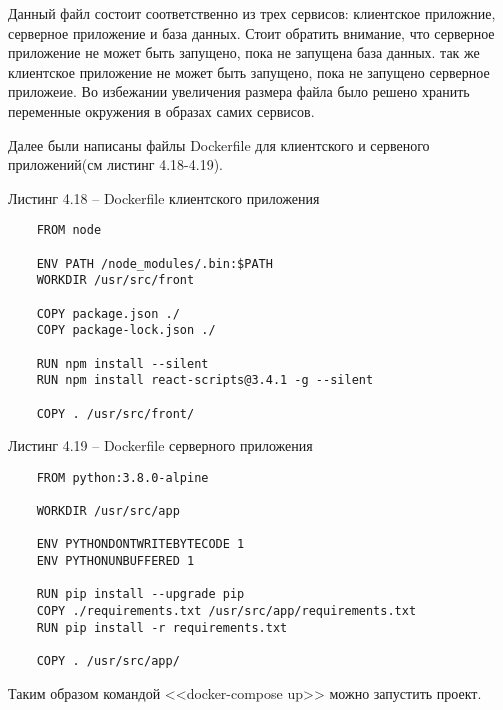 Данный файл состоит соответственно из трех сервисов: клиентское приложние, серверное приложение и база данных.
Стоит обратить внимание, что серверное приложение не может быть запущено, пока не запущена база данных.
так же клиентское приложение не может быть запущено, пока не запущено серверное приложеие.
Во избежании увеличения размера файла было решено хранить переменные окружения в образах самих сервисов.

Далее были написаны файлы Dockerfile для клиентского и сервеного приложений(см листинг 4.18-4.19).


Листинг 4.18 – Dockerfile клиентского приложения
\begin{lstlisting}
    FROM node

    ENV PATH /node_modules/.bin:$PATH
    WORKDIR /usr/src/front

    COPY package.json ./
    COPY package-lock.json ./

    RUN npm install --silent
    RUN npm install react-scripts@3.4.1 -g --silent

    COPY . /usr/src/front/
\end{lstlisting}

Листинг 4.19 – Dockerfile серверного приложения
\begin{lstlisting}
    FROM python:3.8.0-alpine

    WORKDIR /usr/src/app

    ENV PYTHONDONTWRITEBYTECODE 1
    ENV PYTHONUNBUFFERED 1

    RUN pip install --upgrade pip
    COPY ./requirements.txt /usr/src/app/requirements.txt
    RUN pip install -r requirements.txt

    COPY . /usr/src/app/

\end{lstlisting}

Таким образом командой <<docker-compose up>> можно запустить проект.
